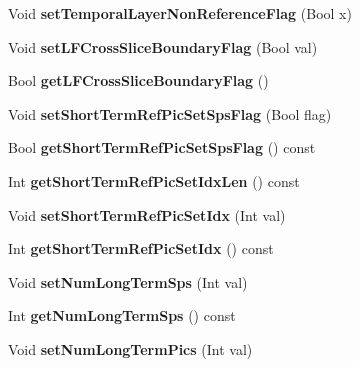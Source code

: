 \begin{DoxyCompactItemize}
Void {\bfseries set\+Temporal\+Layer\+Non\+Reference\+Flag} (Bool x)
\item 
\mbox{\label{class_t_com_slice_a05df52aab099aaaa8645478b70a5c740}} 
Void {\bfseries set\+L\+F\+Cross\+Slice\+Boundary\+Flag} (Bool val)
\item 
\mbox{\label{class_t_com_slice_aaf9987260e77ec85f4ff1e357407b9c4}} 
Bool {\bfseries get\+L\+F\+Cross\+Slice\+Boundary\+Flag} ()
\item 
\mbox{\label{class_t_com_slice_ad32ebf8f89290c3283779be48da55b3e}} 
Void {\bfseries set\+Short\+Term\+Ref\+Pic\+Set\+Sps\+Flag} (Bool flag)
\item 
\mbox{\label{class_t_com_slice_a020435bb994f20c957dc1d20c001fd8e}} 
Bool {\bfseries get\+Short\+Term\+Ref\+Pic\+Set\+Sps\+Flag} () const
\item 
\mbox{\label{class_t_com_slice_a1d0754ee82f40e3b87336c42b91e867f}} 
Int {\bfseries get\+Short\+Term\+Ref\+Pic\+Set\+Idx\+Len} () const
\item 
\mbox{\label{class_t_com_slice_aaff801c8be8e4efa451d4c23356bf738}} 
Void {\bfseries set\+Short\+Term\+Ref\+Pic\+Set\+Idx} (Int val)
\item 
\mbox{\label{class_t_com_slice_a9c02a28208f043252ae7af55e3622d15}} 
Int {\bfseries get\+Short\+Term\+Ref\+Pic\+Set\+Idx} () const
\item 
\mbox{\label{class_t_com_slice_a9a5579f75b50ff207e7d48ae3d9efb10}} 
Void {\bfseries set\+Num\+Long\+Term\+Sps} (Int val)
\item 
\mbox{\label{class_t_com_slice_a1970fedccb0e8c41748c13df8722b674}} 
Int {\bfseries get\+Num\+Long\+Term\+Sps} () const
\item 
\mbox{\label{class_t_com_slice_af230f1e9371035fdf8345bfea96b73af}} 
Void {\bfseries set\+Num\+Long\+Term\+Pics} (Int val)
\item 
\mbox{\label{class_t_com_slice_a909639681a97bd3688f219d166af815f}} 

\end{DoxyCompactItemize}
